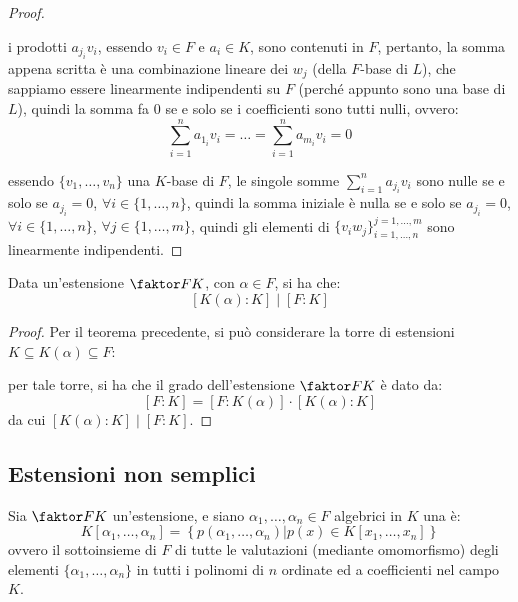 \documentclass[11pt]{scrartcl}
\begin{document}
\begin{proof}
\begin{itemize}
\[	\]
i prodotti $a_{j_i}v_i$, essendo $v_i \in F$ e $a_i \in K$, sono contenuti in $F$, pertanto, la somma appena scritta è una combinazione lineare dei $w_j$ (della $F$-base di $L$), che sappiamo essere linearmente indipendenti su $F$ (perché appunto sono una base di $L$), quindi la somma fa $0$ se e solo se i coefficienti sono tutti nulli, ovvero:
	\[ \sum_{i=1}^{n} a_{1_i}v_i =\ldots=\sum_{i=1}^{n} a_{m_i}v_i = 0
	\]
	\end{itemize}
essendo $\{v_1,\ldots,v_n\}$ una $K$-base di $F$, le singole somme $\sum_{i=1}^{n} a_{j_i}v_i$ sono nulle se e solo se $a_{j_i} = 0$, $\forall i \in\{1,\ldots,n\}$, quindi la somma iniziale è nulla se e solo se $a_{j_i} = 0$, $\forall i \in\{1,\ldots,n\}$, $\forall j \in \{1,\ldots,m\}$, quindi gli elementi di $\{v_iw_j\}_{i=1,\ldots,n}^{j=1,\ldots,m}$ sono linearmente indipendenti.
\end{proof}

\begin{corollary}
Data un'estensione $\faktor FK$, con $\alpha \in F$, si ha che:
	\[ [K(\alpha):K] \mid [F:K]
	\]
\end{corollary}

\begin{proof}
Per il teorema precedente, si può considerare la torre di estensioni $K \subseteq K(\alpha) \subseteq F$:
\begin{center}
\end{center}
per tale torre, si ha che il grado dell'estensione $\faktor FK$ è dato da:
	\[ [F:K] = [F:K(\alpha)] \cdot [K(\alpha):K]
	\]
da cui $[K(\alpha):K] \mid [F:K]$.
\end{proof}

\newpage
\subsection{Estensioni non semplici}

\begin{definition}
Sia $\faktor FK$ un'estensione, e siano $\alpha_1,\ldots,\alpha_n \in F$ algebrici in $K$ una  è:
	\[ K[\alpha_1,\ldots,\alpha_n] = \left\{p(\alpha_1,\ldots,\alpha_n) | p(x) \in K[x_1,\ldots,x_n]\right\}
	\]
ovvero il sottoinsieme di $F$ di tutte le valutazioni (mediante omomorfismo) degli elementi $\{\alpha_1,\ldots,\alpha_n\}$ in tutti i polinomi di $n$ ordinate ed a coefficienti nel campo $K$.
\end{definition}
\end{document}
